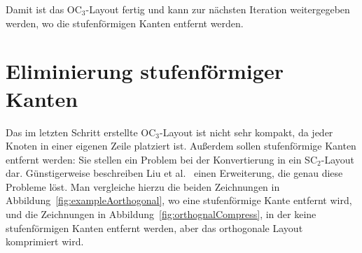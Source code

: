 \documentclass[a4paper]{scrreprt}
\theoremstyle{definition}
\begin{document}
Damit ist das OC$_3$-Layout fertig und kann zur nächsten Iteration weitergegeben werden, wo die stufenförmigen Kanten entfernt werden.


\section{Eliminierung stufenförmiger Kanten}
\label{sec:sEdgeRemoveAlgo}

Das im letzten Schritt erstellte OC$_3$-Layout ist nicht sehr kompakt, da jeder Knoten in einer eigenen Zeile platziert ist. Außerdem sollen stufenförmige Kanten entfernt werden: Sie stellen ein Problem bei der Konvertierung in ein SC$_2$-Layout dar. Günstigerweise beschreiben Liu et al.~\cite{liu+etal-98} einen Erweiterung, die genau diese Probleme löst. Man vergleiche hierzu die beiden Zeichnungen in Abbildung~\ref{fig:exampleAorthogonal}, wo eine stufenförmige Kante entfernt wird, und die Zeichnungen in Abbildung~\ref{fig:orthognalCompress}, in der keine stufenförmigen Kanten entfernt werden, aber das orthogonale Layout komprimiert wird.
\end{document}
